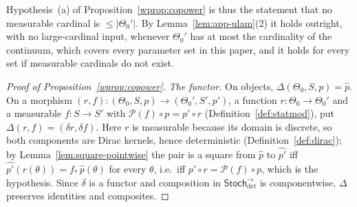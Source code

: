 \documentclass[11pt,a4paper]{article}
\theoremstyle{plain}
\theoremstyle{definition}
\theoremstyle{remark}
\newcommand{\cat}[1]{\mathsf{#1}}
\newcommand{\Stoch}{\cat{Stoch}}
\newcommand{\Prb}{\mathcal{P}}
\newcommand{\del}{\delta}
\newcommand{\Jc}{\Delta}            %
\newcommand{\Arrdet}[1]{#1^{\rightarrow}_{\det}}
\begin{document}
Hypothesis~(a) of Proposition~\ref{wprop:copower} is thus the statement that
no measurable cardinal is $\le |\Theta_0'|$. By Lemma~\ref{lem:app-ulam}(2)
it holds outright, with no large-cardinal input, whenever $\Theta_0'$ has at
most the cardinality of the continuum, which covers every parameter set in
this paper, and it holds for every set if measurable cardinals do not
exist.

\begin{proof}[Proof of Proposition~\ref{wprop:copower}]
\emph{The functor.} On objects, $\Jc(\Theta_0,S,p) = \widehat p$. On a
morphism $(r,f) \colon (\Theta_0,S,p) \to (\Theta_0',S',p')$, a function
$r \colon \Theta_0 \to \Theta_0'$ and a measurable $f \colon S \to S'$ with
$\Prb(f) \circ p = p' \circ r$ (Definition~\ref{def:statmod}), put
$\Jc(r,f) = (\del r, \del f)$. Here $r$ is measurable because its domain is
discrete, so both components are Dirac kernels, hence deterministic
(Definition~\ref{def:dirac}); by Lemma~\ref{lem:square-pointwise} the pair is
a square from $\widehat p$ to $\widehat{p'}$ iff
$\widehat{p'}(r(\theta)) = f_{*}\,\widehat p(\theta)$ for every $\theta$,
i.e.\ iff $p' \circ r = \Prb(f) \circ p$, which is the hypothesis. Since
$\del$ is a functor and composition in $\Arrdet{\Stoch}$ is componentwise,
$\Jc$ preserves identities and composites.


\end{proof}
\end{document}
